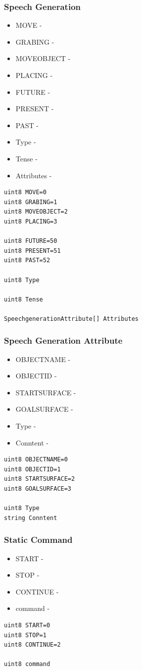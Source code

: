 \documentclass[main.tex]{subfiles}
\begin{document}
				\subsubsection{Speech Generation}
				\label{msg_speech_generation}
				\begin{itemize}
					\item MOVE -
					\item GRABING -
					\item MOVEOBJECT - 
					\item PLACING -
					\item FUTURE -
					\item PRESENT -
					\item PAST -
					\item Type -
					\item Tense -
					\item Attributes -
				\end{itemize}
					\begin{lstlisting}
uint8 MOVE=0
uint8 GRABING=1
uint8 MOVEOBJECT=2
uint8 PLACING=3
		
uint8 FUTURE=50
uint8 PRESENT=51
uint8 PAST=52
		
uint8 Type
		
uint8 Tense
		
SpeechgenerationAttribute[] Attributes
\end{lstlisting}
				\subsubsection{Speech Generation Attribute}
				\label{msg_speech_generation_attribute}
				\begin{itemize}
					\item OBJECTNAME -
					\item OBJECTID -
					\item STARTSURFACE - 
					\item GOALSURFACE -
					\item Type -
					\item Conntent -
				\end{itemize}
					\begin{lstlisting}
uint8 OBJECTNAME=0
uint8 OBJECTID=1
uint8 STARTSURFACE=2
uint8 GOALSURFACE=3
					
uint8 Type
string Conntent
\end{lstlisting}
				\subsubsection{Static Command}
				\label{msg_static_command}
				\begin{itemize}
					\item START -
					\item STOP -
					\item CONTINUE - 
					\item command -
				\end{itemize}
					\begin{lstlisting}
uint8 START=0
uint8 STOP=1
uint8 CONTINUE=2
		
uint8 command
\end{lstlisting}
\end{document}
